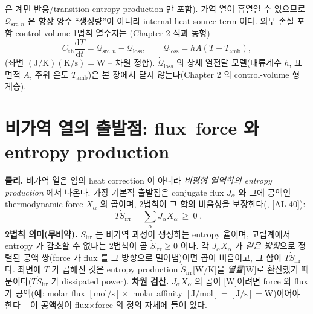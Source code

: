 \documentclass[11pt,a4paper]{article}
\newcommand{\dd}{\mathrm{d}}
\newcommand{\irr}{\mathrm{irr}}
\newcommand{\src}{\mathrm{src}}
\newcommand{\loss}{\mathrm{loss}}
\newcommand{\amb}{\mathrm{amb}}
\newcommand{\AL}[1]{\textsf{[AL-#1]}}
\begin{document}
은 계면 반응/transition entropy production 만 포함). 가역 열이 흡열일 수 있으므로 $\dot{\mathcal Q}_{\src,n}$
은 항상 양수 ``생성량''이 아니라 internal heat source term 이다. 외부 손실 포함 control-volume 1법칙 열수지는
(Chapter 2 식과 동형)
\begin{equation}
C_{\mathrm{th}}\frac{\dd T}{\dd t}=\dot{\mathcal Q}_{\src,n}-\dot{\mathcal Q}_{\loss},\qquad
\dot{\mathcal Q}_{\loss}=hA(T-T_\amb),
\label{eq:ch4_balance}
\end{equation}
(좌변 $\mathrm{(J/K)(K/s)=W}$ -- 차원 정합). $\dot{\mathcal Q}_{\loss}$ 의 상세 열전달 모델(대류계수 $h$, 표면적
$A$, 주위 온도 $T_\amb$)은 본 장에서 닫지 않는다(Chapter 2 의 control-volume 형 계승).

\section{비가역 열의 출발점: flux--force 와 entropy production}\label{sec:ch4_irr}
\textbf{물리.} 비가역 열은 임의 heat correction 이 아니라 \emph{비평형 열역학의 entropy production} 에서 나온다.
가장 기본적 출발점은 conjugate flux $J_\alpha$ 와 그에 공액인 thermodynamic force $X_\alpha$ 의 곱이며, 2법칙이
그 합의 비음성을 보장한다(\cite{degrootmazur1962,onsager1931,prigogine1967,bazant2013}, \AL{40}):
\begin{equation}
\boxed{\;T\dot S_{\irr}=\sum_\alpha J_\alpha X_\alpha\ \ge\ 0\;.}
\label{eq:ch4_fluxforce}
\end{equation}
\textbf{2법칙 의미(무비약).} $\dot S_\irr$ 는 비가역 과정이 생성하는 entropy 율이며, 고립계에서 entropy 가
감소할 수 없다는 2법칙이 곧 $\dot S_\irr\ge0$ 이다. 각 $J_\alpha X_\alpha$ 가 \emph{같은 방향}으로 정렬된
공액 쌍(force 가 flux 를 그 방향으로 밀어냄)이면 곱이 비음이고, 그 합이 $T\dot S_\irr$ 다. 좌변에 $T$ 가 곱해진
것은 entropy production $\dot S_\irr$[W/K]을 \emph{열률}[W]로 환산했기 때문이다($T\dot S_\irr$ 가 dissipated
power). \textbf{차원 검산.} $J_\alpha X_\alpha$ 의 곱이 [W]이려면 force 와 flux 가 공액(예: molar flux
$[\mathrm{mol/s}]\times$ molar affinity $[\mathrm{J/mol}]=[\mathrm{J/s}]=\mathrm W$)이어야 한다 -- 이 공액성이
flux$\times$force 의 정의 자체에 들어 있다.
\end{document}
